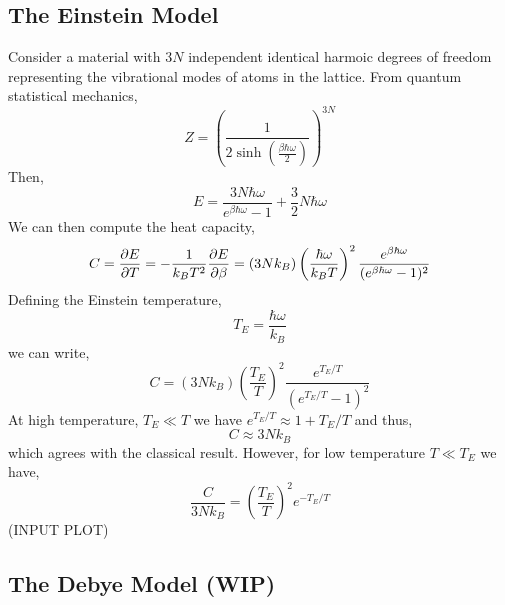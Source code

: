 \documentclass[12pt]{article}
\begin{document}
\subsection{The Einstein Model}

Consider a material with $3N$ independent identical harmoic degrees of freedom representing the vibrational modes of atoms in the lattice. From quantum statistical mechanics,
\[ Z = \left( \frac{1}{2 \sinh{\left( \frac{ \beta \hbar \omega }{2} \right)}} \right)^{3 N}  \]
Then, 
\[ E = \frac{3 N \hbar \omega}{e^{\beta \hbar \omega} - 1} + \frac{3}{2} N \hbar \omega \] 
We can then compute the heat capacity,
\[ C = \frac{\partial{E}}{\partial{T}} = - \frac{1}{k_B T^2} \frac{\partial{E}}{\partial{\beta}} = (3 N k_B) \left( \frac{ \hbar \omega }{k_B T} \right)^2 \frac{e^{\beta \hbar \omega}}{(e^{\beta \hbar \omega} - 1)^2} \]
Defining the Einstein temperature,
\[ T_E = \frac{\hbar \omega}{k_B} \]
we can write,
\[ C = (3 N k_B) \left( \frac{T_E}{T} \right)^2 \frac{e^{T_E / T}}{(e^{T_E/T} - 1)^2} \]
At high temperature, $T_E \ll T$ we have $e^{T_E / T} \approx 1 + T_E / T$ and thus,
\[ C \approx 3 N k_B \]
which agrees with the classical result. However, for low temperature $T \ll T_E$ we have,
\[ \frac{C}{3 N k_B} = \left( \frac{T_E}{T} \right)^2 e^{- T_E / T} \]
(INPUT PLOT)

\subsection{The Debye Model (WIP)}
\end{document}
